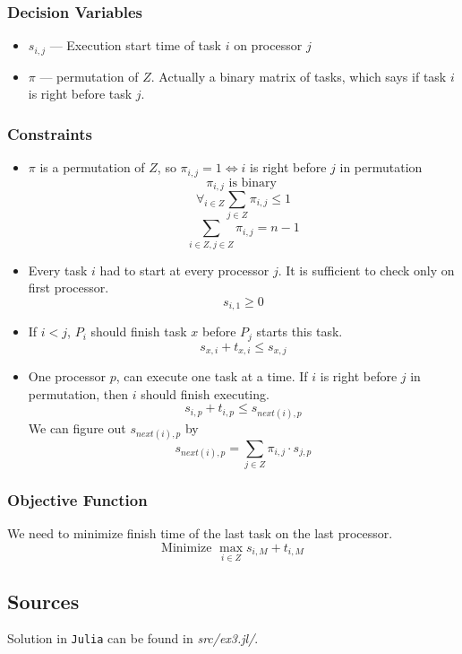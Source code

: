 \subsubsection*{Decision Variables}
\begin{itemize}
    \item $s_{i, j}$ --- Execution start time of task $i$ on processor $j$
    \item $\pi$ --- permutation of $Z$. Actually a binary matrix of tasks, which says if task $i$ is right before task $j$.
\end{itemize}
\subsubsection*{Constraints}
\begin{itemize}
    \item $\pi$ is a permutation of $Z$, so $\pi_{i,j} = 1 \iff i$ is right before $j$ in permutation
    $$\pi_{i,j} \textrm{ is binary }$$
    $$\forall_{i \in Z} \sum_{j \in Z} \pi_{i, j} \leqslant 1$$
    $$\sum_{i \in Z, j \in Z} \pi_{i, j} = n - 1$$
    \item Every task $i$ had to start at every processor $j$. It is sufficient to check only on first processor.
    $$ s_{i, 1} \geqslant 0$$
    \item If $i < j$, $P_i$ should finish task $x$ before $P_j$ starts this task.
    $$s_{x, i} + t_{x, i} \leqslant s_{x, j}$$
    \item One processor $p$, can execute one task at a time. 
    If $i$ is right before $j$ in permutation, then $i$ should finish executing.
    $$s_{i, p} + t_{i, p} \leqslant s_{next(i), p}$$
    We can figure out $s_{next(i), p}$ by
    $$s_{next(i), p} = \sum_{j \in Z} \pi_{i,j} \cdot s_{j,p}$$
    
\end{itemize}
\subsubsection*{Objective Function}
We need to minimize finish time of the last task on the last processor.
$$\textrm{Minimize } \max_{i \in Z}{s_{i, M} + t_{i, M}}$$
\subsection{Sources}
Solution in \texttt{Julia} can be found in \textit{src/ex3.jl/}.

